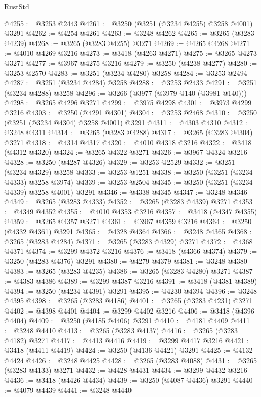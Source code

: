 \begin{lexlean}{RustStd}
\begin{coremodule}
@4255 := @3253 @2443
@4261 := @3250 (@3251 (@3234 @4255) @3258 @4001) @3291
@4262 := @4254 @4261
@4263 := @3248 @4262
@4265 := @3265 (@3283 @4239)
@4268 := @3265 (@3283 @4255) @3271
@4269 := @4265 @4268
@4271 := @4010 @4269 @3216
@4273 := @3418 (@4263 @4271)
@4275 := @3265 @4273 @3271
@4277 := @3967 @4275 @3216
@4279 := @3250 (@4238 @4277)
@4280 := @3253 @2570
@4283 := @3251 (@3234 @4280) @3258
@4284 := @3253 @2494
@4287 := @3251 (@3234 @4284) @3258
@4288 := @3253 @2433
@4291 := @3251 (@3234 @4288) @3258
@4296 := @3266 (@3977 (@3979 @140 (@3981 @140)))
@4298 := @3265 @4296 @3271
@4299 := @3975 @4298
@4301 := @3973 @4299 @3216
@4303 := @3250 (@4291 @4301)
@4304 := @3253 @2468
@4310 := @3250 (@3251 (@3234 @4304) @3258 @4001) @3291
@4311 := @4303 @4310
@4312 := @3248 @4311
@4314 := @3265 (@3283 @4288)
@4317 := @3265 (@3283 @4304) @3271
@4318 := @4314 @4317
@4320 := @4010 @4318 @3216
@4322 := @3418 (@4312 @4320)
@4324 := @3265 @4322 @3271
@4326 := @3967 @4324 @3216
@4328 := @3250 (@4287 @4326)
@4329 := @3253 @2529
@4332 := @3251 (@3234 @4329) @3258
@4333 := @3253 @1251
@4338 := @3250 (@3251 (@3234 @4333) @3258 @3974)
@4339 := @3253 @2504
@4345 := @3250 (@3251 (@3234 @4339) @3258 @4001) @3291
@4346 := @4338 @4345
@4347 := @3248 @4346
@4349 := @3265 (@3283 @4333)
@4352 := @3265 (@3283 @4339) @3271
@4353 := @4349 @4352
@4355 := @4010 @4353 @3216
@4357 := @3418 (@4347 @4355)
@4359 := @3265 @4357 @3271
@4361 := @3967 @4359 @3216
@4364 := @3250 (@4332 @4361) @3291
@4365 := @4328 @4364
@4366 := @3248 @4365
@4368 := @3265 (@3283 @4284)
@4371 := @3265 (@3283 @4329) @3271
@4372 := @4368 @4371
@4374 := @3299 @4372 @3216
@4376 := @3418 (@4366 @4374)
@4379 := @3250 (@4283 @4376) @3291
@4380 := @4279 @4379
@4381 := @3248 @4380
@4383 := @3265 (@3283 @4235)
@4386 := @3265 (@3283 @4280) @3271
@4387 := @4383 @4386
@4389 := @3299 @4387 @3216
@4391 := @3418 (@4381 @4389)
@4394 := @3250 (@4234 @4391) @3291
@4395 := @4230 @4394
@4396 := @3248 @4395
@4398 := @3265 (@3283 @4186)
@4401 := @3265 (@3283 @4231) @3271
@4402 := @4398 @4401
@4404 := @3299 @4402 @3216
@4406 := @3418 (@4396 @4404)
@4409 := @3250 (@4185 @4406) @3291
@4410 := @4181 @4409
@4411 := @3248 @4410
@4413 := @3265 (@3283 @4137)
@4416 := @3265 (@3283 @4182) @3271
@4417 := @4413 @4416
@4419 := @3299 @4417 @3216
@4421 := @3418 (@4411 @4419)
@4424 := @3250 (@4136 @4421) @3291
@4425 := @4132 @4424
@4426 := @3248 @4425
@4428 := @3265 (@3283 @4088)
@4431 := @3265 (@3283 @4133) @3271
@4432 := @4428 @4431
@4434 := @3299 @4432 @3216
@4436 := @3418 (@4426 @4434)
@4439 := @3250 (@4087 @4436) @3291
@4440 := @4079 @4439
@4441 := @3248 @4440

\end{coremodule}
\end{lexlean}
